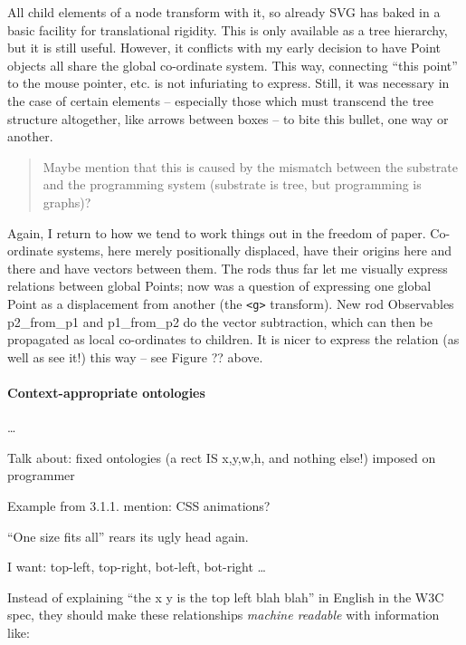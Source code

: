 \documentclass[english,submission]{programming}
\begin{document}
All child elements of a node transform with it, so already SVG has baked
in a basic facility for translational rigidity. This is only available
as a tree hierarchy, but it is still useful. However, it conflicts with
my early decision to have Point objects all share the global co-ordinate
system. This way, connecting ``this point'' to the mouse pointer, etc.
is not infuriating to express. Still, it was necessary in the case of
certain elements -- especially those which must transcend the tree
structure altogether, like arrows between boxes -- to bite this bullet,
one way or another.

\begin{quote}
Maybe mention that this is caused by the mismatch between the substrate
and the programming system (substrate is tree, but programming is
graphs)?
\end{quote}

Again, I return to how we tend to work things out in the freedom of
paper. Co-ordinate systems, here merely positionally displaced, have
their origins here and there and have vectors between them. The rods
thus far let me visually express relations between global Points; now
was a question of expressing one global Point as a displacement from
another (the \texttt{\textless{}g\textgreater{}} transform). New rod
Observables p2\_from\_p1 and p1\_from\_p2 do the vector subtraction,
which can then be propagated as local co-ordinates to children. It is
nicer to express the relation (as well as see it!) this way -- see
Figure ?? above.

\hypertarget{context-appropriate-ontologies}{%
\paragraph{Context-appropriate
ontologies}\label{context-appropriate-ontologies}}

\ldots{}

Talk about: fixed ontologies (a rect IS x,y,w,h, and nothing else!)
imposed on programmer

Example from 3.1.1. mention: CSS animations?

``One size fits all'' rears its ugly head again.

I want: top-left, top-right, bot-left, bot-right \ldots{}

Instead of explaining ``the x y is the top left blah blah'' in English
in the W3C spec, they should make these relationships \emph{machine
readable} with information like:
\end{document}
